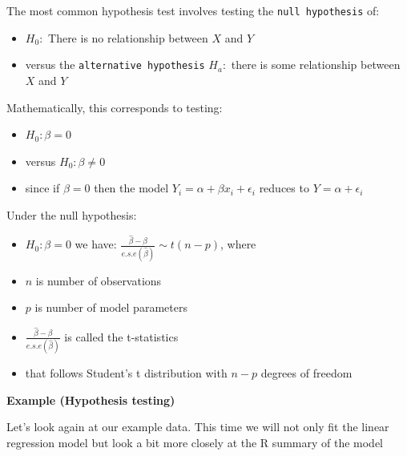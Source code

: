 \documentclass[
]{book}
\providecommand{\tightlist}{%
  \setlength{\itemsep}{0pt}\setlength{\parskip}{0pt}}
\theoremstyle{definition}
\theoremstyle{definition}
\theoremstyle{definition}
\theoremstyle{remark}
\begin{document}
The most common hypothesis test involves testing the \texttt{null\ hypothesis} of:

\begin{itemize}
\tightlist
\item
  \(H_0:\) There is no relationship between \(X\) and \(Y\)
\item
  versus the \texttt{alternative\ hypothesis} \(H_a:\) there is some relationship between \(X\) and \(Y\)
\end{itemize}

Mathematically, this corresponds to testing:

\begin{itemize}
\tightlist
\item
  \(H_0: \beta=0\)
\item
  versus \(H_0: \beta\neq0\)
\item
  since if \(\beta=0\) then the model \(Y_i=\alpha+\beta x_i + \epsilon_i\) reduces to \(Y=\alpha + \epsilon_i\)
\end{itemize}

Under the null hypothesis:

\begin{itemize}
\tightlist
\item
  \(H_0: \beta = 0\) we have: \(\frac{\hat{\beta}-\beta}{e.s.e(\hat{\beta})} \sim t(n-p)\), where
\item
  \(n\) is number of observations
\item
  \(p\) is number of model parameters
\item
  \(\frac{\hat{\beta}-\beta}{e.s.e(\hat{\beta})}\) is called the t-statistics
\item
  that follows Student's t distribution with \(n-p\) degrees of freedom
\end{itemize}

\textbf{Example (Hypothesis testing)}

Let's look again at our example data. This time we will not only fit the linear regression model but look a bit more closely at the R summary of the model
\end{document}
